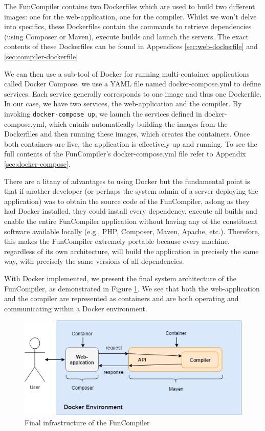 \documentclass{l4proj}
\begin{document}
The FunCompiler contains two Dockerfiles which are used to build two different images: one for the web-application, one for the compiler. Whilst we won't delve into specifics, these Dockerfiles contain the commands to retrieve dependencies (using Composer or Maven), execute builds and launch the servers. The exact contents of these Dockerfiles can be found in Appendices \ref{sec:web-dockerfile} and \ref{sec:compiler-dockerfile}

We can then use a sub-tool of Docker for running multi-container applications called Docker Compose. we use a YAML file named \textsf{docker-compose.yml} to define services. Each service generally corresponds to one image and thus one Dockerfile. In our case, we have two services, the web-application and the compiler. By invoking \texttt{docker-compose up}, we launch the services defined in \textsf{docker-compose.yml}, which entails automatically building the images from the Dockerfiles and then running these images, which creates the containers. Once both containers are live, the application is effectively up and running. To see the full contents of the FunCompiler's \textsf{docker-compose.yml} file refer to Appendix \ref{sec:docker-compose}.

There are a litany of advantages to using Docker but the fundamental point is that if another developer (or perhaps the system admin of a server deploying the application) was to obtain the source code of the FunCompiler, aslong as they had Docker installed, they could install every dependency, execute all builds and enable the entire FunCompiler application without having any of the constituent software available locally (e.g., PHP, Composer, Maven, Apache, etc.). Therefore, this makes the FunCompiler extremely portable because every machine, regardless of its own architecture, will build the application in precisely the same way, with precisely the same versions of all dependencies. 

With Docker implemented, we present the final system architecture of the FunCompiler, as demonstrated in Figure \ref{fig:finalinfra}. We see that both the web-application and the compiler are represented as containers and are both operating and communicating within a Docker environment.
\begin{figure}[h]
\centering
\includegraphics[scale=0.6]{images/finalinfra.png}
\caption{Final infrastructure of the FunCompiler}
\label{fig:finalinfra}	
\end{figure}
\end{document}
